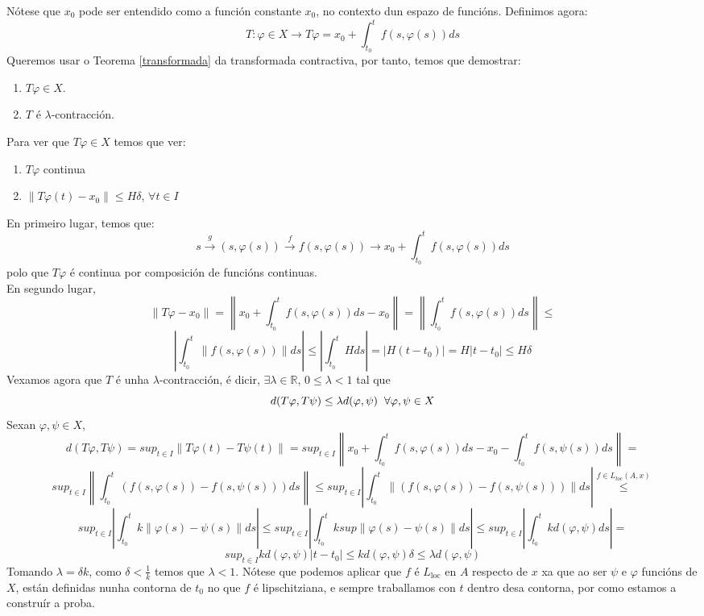 \documentclass[11pt, a4paper,twoside]{article}
\makeatletter
\theoremstyle{theorem-style}  %
\renewenvironment{proof}[1][\proofname]{\par
	\pushQED{\qed}%
	\normalfont \topsep6\p@\@plus6\p@\relax
	\list{}{%
		\settowidth{\leftmargin}{\quad:\hskip\labelsep}%
		\setlength{\labelwidth}{0pt}%
		\setlength{\itemindent}{-\leftmargin}%
	}%
	\item[\hskip\labelsep\itshape#1\@addpunct{:}]\ignorespaces
}{%
	\popQED\endlist\@endpefalse
}
\theoremstyle{definition-style}
\theoremstyle{example-style}
\providecommand{\norm}[1]{\left\lVert#1\right\rVert} %
\providecommand{\abs}[1]{\left\lvert#1\right\rvert} %
\makeatother
\begin{document}
\begin{proof}
	Nótese que $ x_0 $ pode ser entendido como a función constante $ x_0 $, no contexto dun espazo de funcións. Definimos agora:
	\[T:\varphi \in X \longrightarrow T\varphi = x_0 + \int_{t_0}^{t} f(s, \varphi(s))ds\]
	Queremos usar o Teorema \ref{transformada} da transformada contractiva, por tanto, temos que demostrar:
	\begin{enumerate}
		\item $T\varphi \in X$.
		\item $T$ é $\lambda$-contracción.
	\end{enumerate}
	Para ver que $T\varphi \in X$ temos que ver:
	\begin{enumerate}[	i.]
		\item $T\varphi$ continua
		\item $\norm{T\varphi (t) - x_0} \leq H\delta$, $\forall t \in I$
	\end{enumerate}
	En primeiro lugar, temos que:
	\[s \stackrel{g}{\longrightarrow} (s, \varphi (s)) \stackrel{f}{\longrightarrow} f(s, \varphi (s)) \longrightarrow x_0 + \int_{t_0}^{t}f(s,\varphi (s))ds  \]
	polo que $T\varphi$ é continua por composición de funcións continuas. \\
	En segundo lugar, 
	\[\norm{T\varphi - x_0} = \norm{x_0 + \int_{t_0}^{t} f(s, \varphi (s)) ds - x_0} = \norm{\int_{t_0}^{t} f(s, \varphi (s)) ds} \leq \]
	\[\abs{\int_{t_0}^{t} \norm{f(s, \varphi (s))}ds} \leq \abs{\int_{t_0}^{t} H ds} = \abs{H(t - t_0)} = H\abs{t - t_0} \leq H\delta \]
	Vexamos agora que $T$ é unha $\lambda$-contracción, é dicir, $\exists \lambda \in \mathbb{R}$, $0 \leq \lambda < 1$ tal que
	\[d(T\varphi, T\psi) \leq \lambda d(\varphi, \psi) \hspace{0,2cm} \forall \varphi, \psi \in X\]
	Sexan $\varphi, \psi \in X$, \\
	\[d(T\varphi, T\psi) = sup_{t \in I} \norm{T\varphi (t) - T\psi (t)} = sup_{t \in I} \norm{x_0 + \int_{t_0}^{t} f(s, \varphi(s))ds - x_0 - \int_{t_0}^{t} f(s, \psi(s))ds} = \]
	\[sup_{t \in I} \norm{\int_{t_0}^{t} (f(s, \varphi(s)) - f(s, \psi(s)))ds} \leq sup_{t \in I} \abs{\int_{t_0}^{t} \norm{(f(s, \varphi(s)) - f(s, \psi(s)))}ds} \stackrel{f \in L_{loc} (A, x)}{\leq} \] 
	\[sup_{t \in I} \abs{\int_{t_0}^{t} k\norm{\varphi(s) - \psi(s)}ds} \leq sup_{t \in I} \abs{\int_{t_0}^{t} k sup\norm{\varphi(s) - \psi(s)}ds} \leq sup_{t \in I} \abs{\int_{t_0}^{t} k d(\varphi, \psi)ds} = \]
	\[sup_{t \in I} kd(\varphi, \psi)\abs{t - t_0} \leq kd(\varphi, \psi)\delta \leq \lambda d(\varphi, \psi)\]
	Tomando $\lambda = \delta k$, como $\delta < \frac{1}{k}$ temos que $\lambda < 1$. Nótese que podemos aplicar que $ f $ é $ L_{\text{loc}} $ en $ A $ respecto de $ x $ xa que ao ser $ \psi $ e $ \varphi $ funcións de $ X $, están definidas nunha contorna de $ t_0 $ no que $ f $ é lipschitziana, e sempre traballamos con $ t $ dentro desa contorna, por como estamos a construír a proba.
	

\end{proof}
\end{document}
